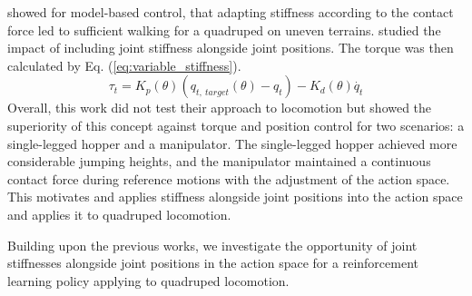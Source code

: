 \cite{zhao2022variable} showed for model-based control, that adapting stiffness according to the contact force led to sufficient walking for a quadruped on uneven terrains. \cite{vic_sensible_tasks} studied the impact of including joint stiffness alongside joint positions. 
The torque was then calculated by Eq. (\ref{eq:variable_stiffness}).  
\begin{equation}
    \tau_t = K_p(\theta) (q_{t,\ target}(\theta) - q_t) - K_d(\theta) \dot{q_t}  \label{eq:variable_stiffness}
\end{equation}
Overall, this work did not test their approach to locomotion but showed the superiority of this concept against torque and position control for two scenarios: a single-legged hopper and a manipulator. The single-legged hopper achieved more considerable jumping heights, and the manipulator maintained a continuous contact force during reference motions with the adjustment of the action space. 
This motivates and applies stiffness alongside joint positions into the action space and applies it to quadruped locomotion.

Building upon the previous works, we investigate the opportunity of joint stiffnesses alongside joint positions in the action space for a reinforcement learning policy applying to quadruped locomotion.